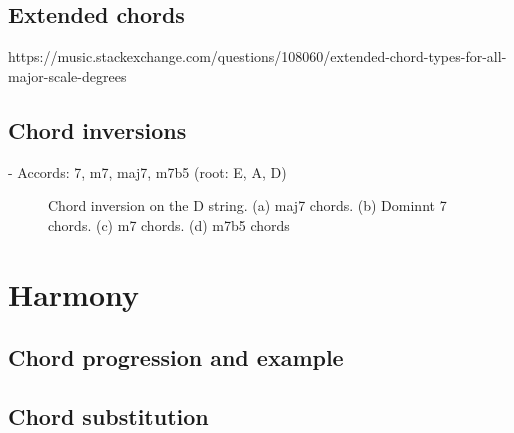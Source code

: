 \documentclass{article}
\begin{document}


\subsection{Extended chords}

https://music.stackexchange.com/questions/108060/extended-chord-types-for-all-major-scale-degrees

\newpage
\subsection{Chord inversions}

- Accords: 7, m7, maj7, m7b5 (root: E, A, D)

\begin{figure}[h!]
	\centering
	\hspace*{-2.2cm}
	\scalebox{0.7}{}
	\hspace*{-2.2cm}
	\scalebox{0.7}{}
	\hspace*{-2.2cm}
	\scalebox{0.7}{}
	\hspace*{-2.2cm}
	\scalebox{0.7}{}
	\caption{Chord inversion on the D string. (a) maj7 chords. (b) Dominnt 7 chords. (c) m7 chords. (d) m7b5 chords }
	\label{fig}
\end{figure}

\newpage
\section{Harmony}
\subsection{Chord progression and example}



\subsection{Chord substitution}
\end{document}
